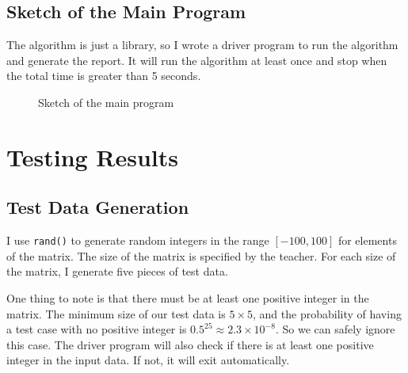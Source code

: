\documentclass[a4paper,oneside]{book}
\begin{document}
\section{Sketch of the Main Program}

The algorithm is just a library, so I wrote a driver program to run the
algorithm and generate the report. It will run the algorithm at least once and stop
when the total time is greater than 5 seconds.

\begin{figure}[!ht]
    \centering
    \caption{Sketch of the main program}
\end{figure}

\chapter{Testing Results}

\section{Test Data Generation}

I use \verb|rand()| to generate random integers in the range $[-100, 100]$ for
elements of the matrix. The size of the matrix is specified by the
teacher. For each size of the matrix, I generate five pieces of test data.

One thing to note is that there must be at least one positive integer in the
matrix. The minimum size of our test data is $5 \times 5$, and the probability
of having a test case with no positive integer is $0.5 ^ {25} \approx 2.3 \times
10^{-8}$. So we can safely ignore this case. The driver program will also check
if there is at least one positive integer in the input data. If not, it will
exit automatically.
\end{document}
